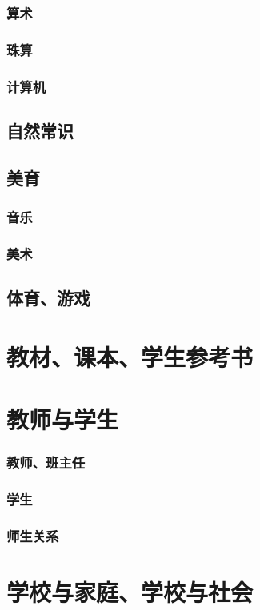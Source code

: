 \documentclass[UTF8]{../../ApplicationUniverse}
\begin{document}
        \subsubsection{算术}
        \subsubsection{珠算}
        \subsubsection{计算机}
    \subsection{自然常识}
    \subsection{美育}
        \subsubsection{音乐}
        \subsubsection{美术}
    \subsection{体育、游戏}
\section{教材、课本、学生参考书}
\section{教师与学生}
    \subsubsection{教师、班主任}
    \subsubsection{学生}
    \subsubsection{师生关系}
\section{学校与家庭、学校与社会}
\end{document}
